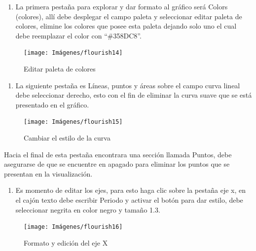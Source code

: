 \documentclass[
]{book}
\providecommand{\tightlist}{%
  \setlength{\itemsep}{0pt}\setlength{\parskip}{0pt}}
\begin{document}
\begin{enumerate}
\def\labelenumi{\arabic{enumi}.}
\setcounter{enumi}{3}
\tightlist
\item
  La primera pestaña para explorar y dar formato al gráfico será Colors (colores), allí debe desplegar el campo paleta y seleccionar editar paleta de colores, elimine los colores que posee esta paleta dejando solo uno el cual debe reemplazar el color con ``\#358DC8''.
\end{enumerate}

\begin{figure}

{\centering \texttt{[image: Imágenes/flourish14]} 

}

\caption{Editar paleta de colores}\label{fig:editarpaletadecoloresflourish-fig}
\end{figure}

\begin{enumerate}
\def\labelenumi{\arabic{enumi}.}
\setcounter{enumi}{4}
\tightlist
\item
  La siguiente pestaña es Líneas, puntos y áreas sobre el campo curva lineal debe seleccionar derecho, esto con el fin de eliminar la curva suave que se está presentado en el gráfico.
\end{enumerate}

\begin{figure}

{\centering \texttt{[image: Imágenes/flourish15]} 

}

\caption{Cambiar el estilo de la curva}\label{fig:fromatodelacurvaflourish-fig}
\end{figure}

Hacia el final de esta pestaña encontrara una sección llamada Puntos, debe asegurarse de que se encuentre en apagado para eliminar los puntos que se presentan en la visualización.

\begin{enumerate}
\def\labelenumi{\arabic{enumi}.}
\setcounter{enumi}{5}
\tightlist
\item
  Es momento de editar los ejes, para esto haga clic sobre la pestaña eje x, en el cajón texto debe escribir Periodo y activar el botón para dar estilo, debe seleccionar negrita en color negro y tamaño 1.3.
\end{enumerate}

\begin{figure}

{\centering \texttt{[image: Imágenes/flourish16]} 

}

\caption{Formato y edición del eje X}\label{fig:editarejexflourish-fig}
\end{figure}
\end{document}

